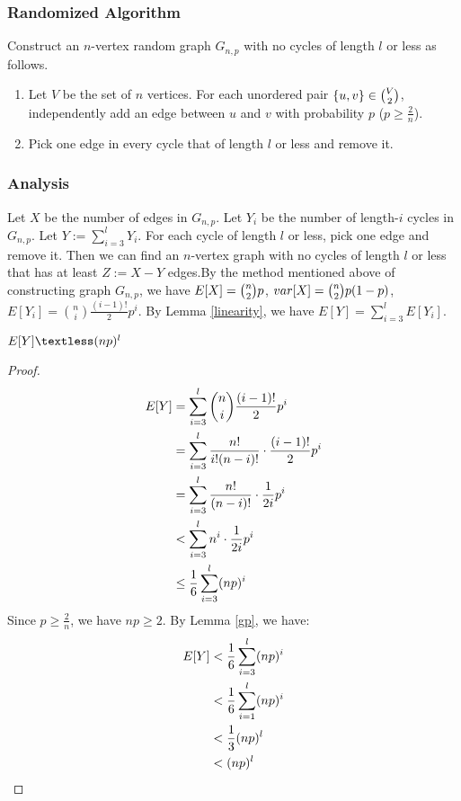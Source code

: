 \subsubsection{Randomized Algorithm}
Construct an $n$-vertex random graph $G_{n,p}$ with no cycles of length $l$ or less as follows. 
\begin{enumerate}
    \item Let $V$ be the set of $n$ vertices. For each unordered pair $\{u,v\}\in \tbinom{V}{2}$, independently add an edge between $u$ and $v$ with probability $p$ ($p\ge \frac{2}{n}$).
    \item Pick one edge in every cycle that of length $l$ or less and remove it.
\end{enumerate}

\subsubsection{Analysis}\label{Analysis} 
Let $X$ be the number of edges in $G_{n,p}$. Let $Y_i$ be the number of length-$i$ cycles in $G_{n,p}$. Let $Y:=\sum_{i=3}^{l}Y_i$.
For each cycle of length $l$ or less, pick one edge and remove it.
Then we can find an $n$-vertex graph with no cycles of length $l$ or less that has at least $Z:=X-Y$ edges.By the method mentioned above of constructing graph $G_{n,p}$, we have $E[X]=\tbinom{n}{2}p$, $var[X]=\tbinom{n}{2}p(1-p)$, $E[Y_i]=\binom{n}{i}\frac{(i-1)!}{2}p^i$. By Lemma \ref{linearity}, we have $E[Y]=\sum_{i=3}^{l}E[Y_i]$.
\begin{claim}
$E[Y]\textless (np)^l$
\end{claim}
\begin{proof}
\begin{align}
\nonumber E[Y]&=\sum_{i=3}^{l} \binom{n}{i}\frac{(i-1)!}{2}p^i\\
\nonumber &=\sum_{i=3}^{l} \frac{n!}{i!(n-i)!}\cdot\frac{(i-1)!}{2}p^i\\
\nonumber &=\sum_{i=3}^{l} \frac{n!}{(n-i)!}\cdot\frac{1}{2i}p^i\\
\nonumber &\textless \sum_{i=3}^{l}n^i\cdot\frac{1}{2i}p^i\\
\nonumber &\le \frac{1}{6} \sum_{i=3}^{l}(np)^i
\end{align}
Since $p \ge \frac{2}{n}$, we have $np\ge 2$.
By Lemma \ref{gp}, we have:
\begin{align}
    \nonumber E[Y]& \textless   \frac{1}{6}\sum_{i=3}^{l}(np)^i \\
    \nonumber & \textless \frac{1}{6}\sum_{i=1}^{l}(np)^i \\
    \nonumber & \textless \frac{1}{3}(np)^l\\
    \nonumber & \textless (np)^l
\end{align}
\end{proof}

